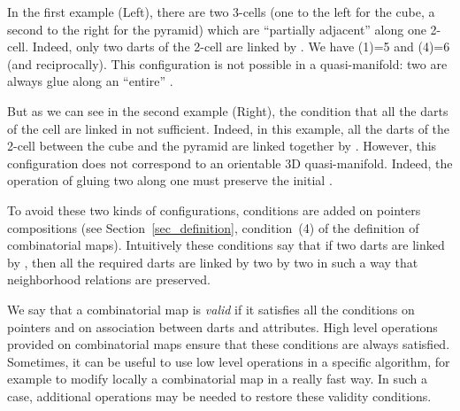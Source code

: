 In the first example (Left), there are two 3-cells (one to the left
for the cube, a second to the right for the pyramid) which are
``partially adjacent'' along one 2-cell. Indeed, only two darts
of the 2-cell are linked by \betatrois{}. We have \betatrois{}(1)=5 and
\betatrois{}(4)=6 (and reciprocally).  This configuration is not possible
in a quasi-manifold: two  are always glue along an ``entire''
.

But as we can see in the second example (Right), the condition that
all the darts of the cell are linked in not sufficient. Indeed, in
this example, all the darts of the 2-cell between the cube and the
pyramid are linked together by \betatrois{}. However, this configuration
does not correspond to an orientable 3D quasi-manifold. Indeed, the
operation of gluing two  along one  must
preserve the initial .

To avoid these two kinds of configurations, conditions are added on
\betats{} pointers compositions (see Section~\ref{sec_definition},
condition~(4) of the definition of combinatorial maps). Intuitively
these conditions say that if two darts are linked by \betai{}, then
all the required darts are linked by \betai{} two by two in such a
way that neighborhood relations are preserved.


We say that a combinatorial map is \emph{valid} if it satisfies all
the conditions on \betats{} pointers and on association between darts
and attributes.  High level operations provided on combinatorial maps
ensure that these conditions are always satisfied. Sometimes, it can
be useful to use low level operations in a specific algorithm, for
example to modify locally a combinatorial map in a really fast way. In
such a case, additional operations may be needed to restore these
validity conditions.

%





